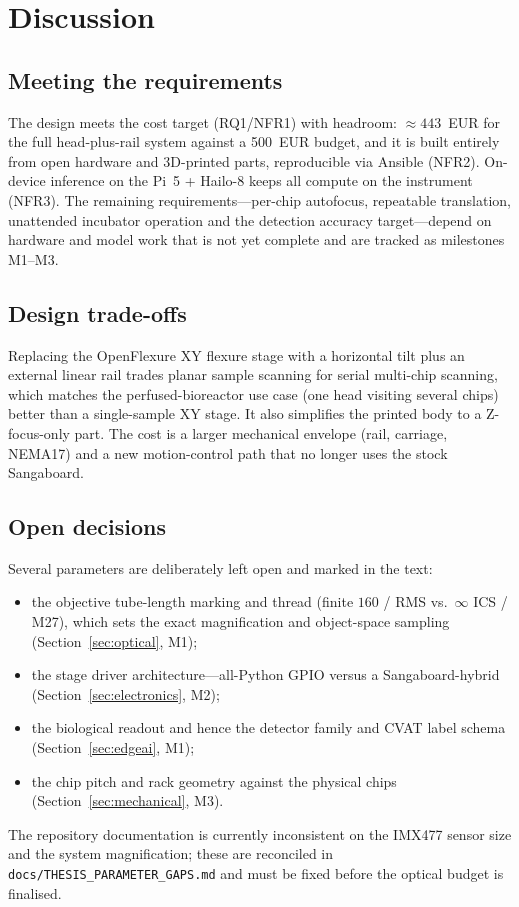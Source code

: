 \section{Discussion}
\label{sec:discussion}

\subsection{Meeting the requirements}
The design meets the cost target (RQ1/NFR1) with headroom: $\approx\num{443}$~EUR
for the full head-plus-rail system against a \num{500}~EUR budget, and it is
built entirely from open hardware and 3D-printed parts, reproducible via Ansible
(NFR2). On-device inference on the Pi~5 + Hailo-8 keeps all compute on the
instrument (NFR3). The remaining requirements---per-chip autofocus, repeatable
translation, unattended incubator operation and the detection accuracy
target---depend on hardware and model work that is not yet complete and are
tracked as milestones M1--M3.

\subsection{Design trade-offs}
Replacing the OpenFlexure XY flexure stage with a horizontal tilt plus an
external linear rail trades planar sample scanning for serial multi-chip
scanning, which matches the perfused-bioreactor use case (one head visiting
several chips) better than a single-sample XY stage. It also simplifies the
printed body to a Z-focus-only part. The cost is a larger mechanical envelope
(rail, carriage, NEMA17) and a new motion-control path that no longer uses the
stock Sangaboard.

\subsection{Open decisions}
Several parameters are deliberately left open and marked in the text:
\begin{itemize}
\item the objective tube-length marking and thread (finite $160$ / RMS vs.\
  $\infty$ ICS / M27), which sets the exact magnification and object-space
  sampling (Section~\ref{sec:optical}, M1);
\item the stage driver architecture---all-Python GPIO versus a Sangaboard-hybrid
  (Section~\ref{sec:electronics}, M2);
\item the biological readout and hence the detector family and CVAT label schema
  (Section~\ref{sec:edgeai}, M1);
\item the chip pitch and rack geometry against the physical chips
  (Section~\ref{sec:mechanical}, M3).
\end{itemize}
The repository documentation is currently inconsistent on the IMX477 sensor size
and the system magnification; these are reconciled in
\texttt{docs/THESIS\_PARAMETER\_GAPS.md} and must be fixed before the optical
budget is finalised.


